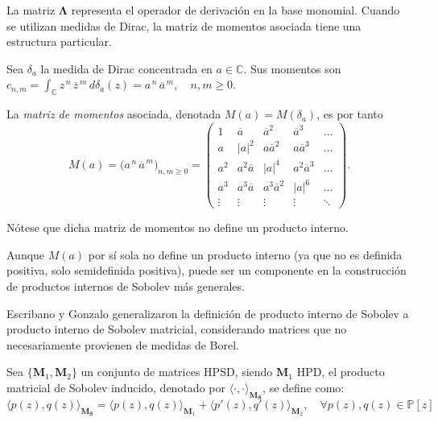 La matriz $\boldsymbol{\Lambda}$ representa el operador de derivación en la base monomial. Cuando se utilizan medidas de Dirac, la matriz de momentos asociada tiene una estructura particular.

\begin{definition}\label{def:dirac_measure_matrix}
  \cite{escribano2025boundedness}
  Sea \(\delta_{a}\) la medida de Dirac concentrada en \(a\in\mathbb C\).
  Sus momentos son
  \(
  c_{n,m}= \displaystyle\int_{\mathbb C} z^{\,n}\,\overline{z}^{\,m}\,d\delta_{a}(z)
  = a^{\,n}\,\overline{a}^{\,m},
  \quad n,m\ge0.
  \)

  La \emph{matriz de momentos} asociada,
  denotada \(M(a)=M(\delta_{a})\), es por tanto
  \[
    M(a)=\bigl(a^{\,n}\,\overline{a}^{\,m}\bigr)_{n,m\ge0}
    =
    \begin{pmatrix}
      1      & \overline{a}      & \overline{a}^{2}      & \overline{a}^{3}      & \dots  \\
      a      & |a|^{2}           & a\overline{a}^{2}     & a\overline{a}^{3}     & \dots  \\
      a^{2}  & a^{2}\overline{a} & |a|^{4}               & a^{2}\overline{a}^{3} & \dots  \\
      a^{3}  & a^{3}\overline{a} & a^{3}\overline{a}^{2} & |a|^{6}               & \dots  \\
      \vdots & \vdots            & \vdots                & \vdots                & \ddots
    \end{pmatrix}.
  \]

  Nótese que dicha matriz de momentos no define un producto interno.
\end{definition}

Aunque $M(a)$ por sí sola no define un producto interno (ya que no es definida positiva, solo semidefinida positiva), puede ser un componente en la construcción de productos internos de Sobolev más generales.

Escribano y Gonzalo generalizaron la definición de producto interno de Sobolev a producto interno de Sobolev matricial, considerando matrices que no necesariamente provienen de medidas de Borel.

\begin{definition}\label{def:sobolev_matrix_product}
  \cite{escribano2025boundedness} Sea $\{\textbf{M}_1,\textbf{M}_2\}$ un conjunto de matrices HPSD, siendo $\textbf{M}_1$ HPD, el producto matricial de Sobolev inducido, denotado por $\langle \cdot, \cdot \rangle_{\textbf{M}_{\textbf{S}}}$, se define como:
  \begin{equation}
    \langle p(z), q(z) \rangle_{\textbf{M}_{\textbf{S}}} = \langle p(z), q(z) \rangle_{\textbf{M}_1} + \langle p'(z), q'(z) \rangle_{\textbf{M}_2},\quad \forall p(z), q(z) \in \mathbb{P}[z]
  \end{equation}
\end{definition}

